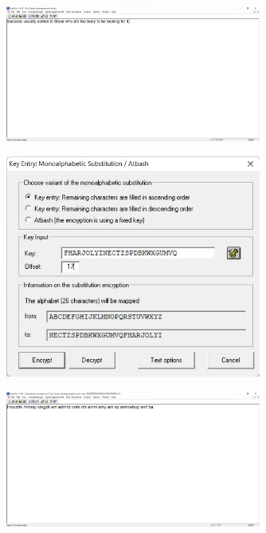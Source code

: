 \documentclass{article}
\begin{document}
\begin{figure}[H]
    \centering
    \includegraphics[width=0.75\textwidth]{figures/2a.jpg}
    \caption
	{}
    \label{fig:fig1}
\end{figure}

\begin{figure}[H]
    \centering
    \includegraphics[width=0.75\textwidth]{figures/2b.jpg}
    \caption
	{}
    \label{fig:fig1}
\end{figure}

\begin{figure}[H]
    \centering
    \includegraphics[width=0.75\textwidth]{figures/2c.jpg}
    \caption
	{}
    \label{fig:fig1}
\end{figure}
\end{document}
